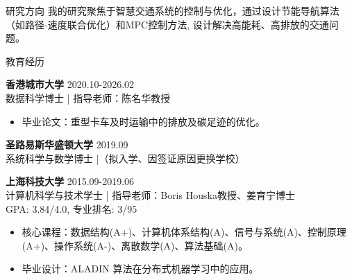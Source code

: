 \documentclass{resume} %
\newcommand{\trianglebullet}{$\mbox{\ensuremath{\rhd}}$}
\begin{document}



\begin{rSection}{研究方向}
    我的研究聚焦于智慧交通系统的控制与优化，通过设计节能导航算法（如路径-速度联合优化）和MPC控制方法, 设计解决高能耗、高排放的交通问题。
\end{rSection}

\begin{rSection}{教育经历}

    \textbf{香港城市大学}  \hfill {2020.10-2026.02} 
    \\ 数据科学博士 | 指导老师：陈名华教授 
    \begin{itemize}
        \item 毕业论文：重型卡车及时运输中的排放及碳足迹的优化。
    \end{itemize}

    \textbf{圣路易斯华盛顿大学}  \hfill {2019.09}
    \\ 系统科学与数学博士 |（拟入学、因签证原因更换学校） 

    \textbf{上海科技大学}  \hfill {2015.09-2019.06} 
    \\ 计算机科学与技术学士 | 指导老师：Boris Houska教授、姜育宁博士 
    \\ GPA: 3.84/4.0, 专业排名: 3/95
    \begin{itemize}
        \item 核心课程：数据结构(A+)、计算机体系结构(A)、信号与系统(A)、控制原理(A+)、操作系统(A-)、离散数学(A)、算法基础(A)。
        \item 毕业设计：ALADIN 算法在分布式机器学习中的应用。
    \end{itemize}



\end{rSection}
\end{document}
